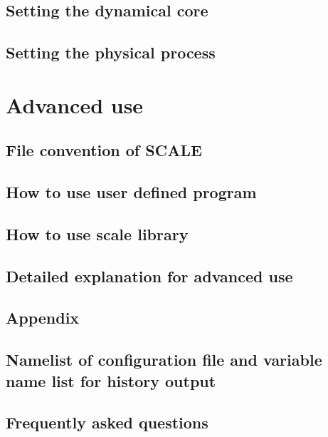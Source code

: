 \documentclass[a4paper]{report}
\begin{document}
 \chapter{Setting the dynamical core} 
 

 \chapter{Setting the physical process} \label{sec:basic_usel_physics}
 

\part{Advanced use} \label{part:advance_use}
 \chapter{File convention of SCALE}
 \chapter{How to use user defined program}
 \chapter{How to use scale library}


\chapter{Detailed explanation for advanced use} \label{chap:detail}





\begin{appendix}
\part{Appendix}
\chapter{Namelist of configuration file and variable name list for history output} \label{achap:namelist}

\chapter{Frequently asked questions} \label{achap:practice}


\end{appendix}


\ClearWallPaper

\end{document}
